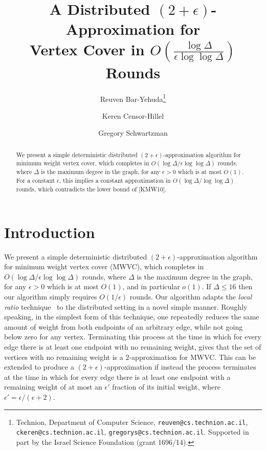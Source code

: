 \documentclass[11pt]{article}
\newcommand*\samethanks[1][\value{footnote}]{\footnotemark[#1]}
\begin{document}
\begin{titlepage}
\title{A Distributed $(2+\epsilon)$-Approximation for\\ Vertex Cover in $O\left(\frac{\log{\Delta}}{\epsilon\log\log{\Delta}}\right)$ Rounds}
\author{Reuven Bar-Yehuda\thanks{Technion, Department of Computer Science, \texttt{reuven@cs.technion.ac.il}, \texttt{ckeren@cs.technion.ac.il}, \texttt{gregorys@cs.technion.ac.il}. Supported in part by the Israel Science Foundation (grant 1696/14).}
\and Keren Censor-Hillel\samethanks \and Gregory Schwartzman\samethanks}
\maketitle

\begin{abstract}
We present a simple deterministic distributed $(2+\epsilon)$-approximation algorithm for minimum weight vertex cover, which completes in $O(\log{\Delta}/\epsilon\log\log{\Delta})$ rounds, where $\Delta$ is the maximum degree in the graph, for any $\epsilon>0$ which is at most $O(1)$. For a constant $\epsilon$, this implies a constant approximation in $O(\log{\Delta}/\log\log{\Delta})$ rounds, which contradicts the lower bound of [KMW10].
\end{abstract}

\thispagestyle{empty}
\end{titlepage}

\section{Introduction}
We present a simple deterministic distributed $(2+\epsilon)$-approximation algorithm for minimum weight vertex cover (MWVC), which completes in $O(\log{\Delta}/\epsilon\log\log{\Delta})$ rounds, where $\Delta$ is the maximum degree in the graph, for any $\epsilon>0$ which is at most $O(1)$, and in particular $o(1)$. If $\Delta \leq 16$ then our algorithm simply requires $O(1/\epsilon)$ rounds.
Our algorithm adapts the \emph{local ratio} technique~\cite{BarYehudaE1985} to the distributed setting in a novel simple manner. Roughly speaking, in the simplest form of this technique, one repeatedly reduces the same amount of weight from both endpoints of an arbitrary edge, while not going below zero for any vertex. Terminating this process at the time in which for every edge there is at least one endpoint with no remaining weight, gives that the set of vertices with no remaining weight is a $2$-approximation for MWVC. This can be extended to produce a $(2+\epsilon)$-approximation if instead the process terminates at the time in which for every edge there is at least one endpoint with a remaining weight of at most an $\epsilon'$ fraction of its initial weight, where $\epsilon'=\epsilon/(\epsilon+2)$.
\end{document}
